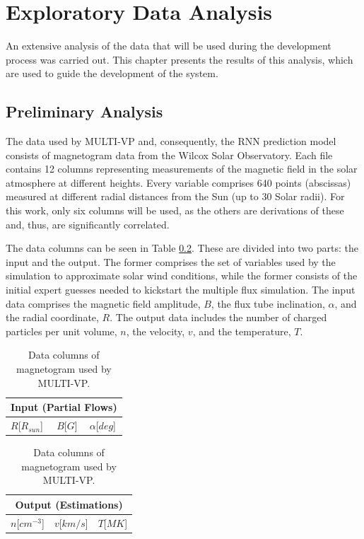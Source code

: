 \chapter*{Exploratory Data Analysis}\label{chap:eda}
An extensive analysis of the data that will be used during the development process was carried out. This chapter presents the results of this analysis, which are used to guide the development of the system.


\section{Preliminary Analysis}\label{sec:data_prelim_analysis}
The data used by MULTI-VP and, consequently, the RNN prediction model consists of magnetogram data from the Wilcox Solar Observatory. Each file contains 12 columns representing measurements of the magnetic field in the solar atmosphere at different heights. Every variable comprises 640 points (abscissas) measured at different radial distances from the Sun (up to 30 Solar radii). For this work, only six columns will be used, as the others are derivations of these and, thus, are significantly correlated. 

The data columns can be seen in Table \ref{tab:multivp_columns}. These are divided into two parts: the input and the output. The former comprises the set of variables used by the simulation to approximate solar wind conditions, while the former consists of the initial expert guesses needed to kickstart the multiple flux simulation. The input data comprises the magnetic field amplitude, $B$, the flux tube inclination, $\alpha$, and the radial coordinate, $R$. The output data includes the number of charged particles per unit volume, $n$, the velocity, $v$, and the temperature, $T$.

\begin{table}[ht]
    \caption{Data columns of magnetogram used by MULTI-VP.}
    \label{tab:multivp_columns}
    \begin{subtable}[h]{0.32\textwidth}
        \centering
        \begin{tabular}{lcc}
        \hline
        \multicolumn{3}{c}{Input (Partial Flows)}                              \\ \hline
        $R${[}$R_{sun}${]} & $B${[}$G${]} & $\alpha${[}$deg${]} \\ \hline
        \end{tabular}
    \end{subtable}
    \begin{subtable}[h]{0.32\textwidth}
        \centering
        \begin{tabular}{ccc}
        \hline
        \multicolumn{3}{c}{Output (Estimations)}                           \\ \hline
        $n${[}$cm^{-3}${]} & $v${[}$km/s${]} & $T${[}$MK${]} \\ \hline
        \end{tabular}
    \end{subtable}
\end{table}

